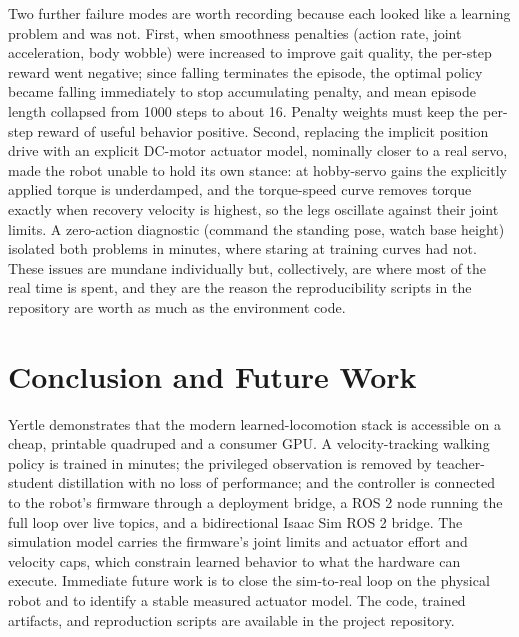 \documentclass[11pt]{article}
\begin{document}
Two further failure modes are worth recording because each looked like a
learning problem and was not. First, when smoothness penalties (action rate,
joint acceleration, body wobble) were increased to improve gait quality, the
per-step reward went negative; since falling terminates the episode, the optimal
policy became falling immediately to stop accumulating penalty, and mean episode
length collapsed from 1000 steps to about 16. Penalty weights must keep the
per-step reward of useful behavior positive. Second, replacing the implicit
position drive with an explicit DC-motor actuator model, nominally closer to a
real servo, made the robot unable to hold its own stance: at hobby-servo gains
the explicitly applied torque is underdamped, and the torque-speed curve removes
torque exactly when recovery velocity is highest, so the legs oscillate against
their joint limits. A zero-action diagnostic (command the standing pose, watch
base height) isolated both problems in minutes, where staring at training curves
had not. These issues are mundane individually but, collectively, are where most
of the real time is spent, and they are the reason the reproducibility scripts in
the repository are worth as much as the environment code.

\section{Conclusion and Future Work}
Yertle demonstrates that the modern learned-locomotion stack is accessible on a
cheap, printable quadruped and a consumer GPU. A velocity-tracking walking policy
is trained in minutes; the privileged observation is removed by teacher-student
distillation with no loss of performance; and the controller is connected to the
robot's firmware through a deployment bridge, a ROS 2 node running the full loop
over live topics, and a bidirectional Isaac Sim ROS 2 bridge. The simulation
model carries the firmware's joint limits and actuator effort and velocity caps,
which constrain learned behavior to what the hardware can execute. Immediate
future work is to close the sim-to-real loop on the physical robot and to
identify a stable measured actuator model. The code, trained artifacts, and
reproduction scripts are available in the project repository.

\printbibliography
\end{document}
